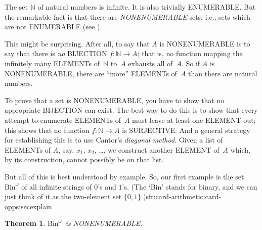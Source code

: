 \documentclass[10pt,a4paper]{article}
\makeatletter
\newcommand*{\olup}[1]{\MakeUppercase{#1}}
\theoremstyle{plain}
\newtheorem{thm}{Theorem}[section]
\theoremstyle{definition}
\theoremstyle{remark}
\newenvironment{explain}{}{}
\newcommand*{\ollabel}[1]{\label{#1}}
\newcommand{\olref}{\@ifnextchar[{\olref@i}{\olref@final}}
\def\olref@i[#1]{\@ifnextchar[{\olref@ii}{\olref@final}}
\def\olref@ii[#1]{\@ifnextchar[{\olref@iii}{\olref@final}}
\def\olref@iii[#1]{\olref@final}
\def\olref@final#1{\ref{#1}}
\providecommand{\Nat}{\ensuremath{\mathbb{N}}}
\providecommand{\funfromto}[3]{#1\colon #2 \to #3}
\providecommand{\Bin}{\mathrm{Bin}}
\providecommand{\oliflabeldef}[3]{#1}
\makeatother
\begin{document}
\begin{explain}
The set $\Nat$ of natural numbers is infinite. It is also trivially
\olup{enumerable}. But the remarkable fact is that there are
\emph{\olup{nonenumerable}} sets, i.e., sets which are not \olup{enumerable}
(see \olref[sfr][siz][enm-alt]{defn:enumerable}).

This might be surprising. After all, to say that $A$ is
\olup{nonenumerable} is to say that there is \emph{no} \olup{bijection} $f
\colon \Nat \to A$; that is, no function mapping the infinitely many
\olup{element}s of~$\Nat$ to~$A$ exhausts all of~$A$.  So if $A$ is
\olup{nonenumerable}, there are ``more'' \olup{element}s of~$A$ than there
are natural numbers.

To prove that a set is \olup{nonenumerable}, you have to show that no
appropriate \olup{bijection} can exist. The best way to do this is to
show that every attempt to enumerate \olup{element}s of~$A$ must leave at
least one \olup{element} out; this shows that no function $f\colon \Nat
\to A$ is \olup{surjective}. And a general strategy for establishing this
is to use Cantor's \emph{diagonal method}. Given a list of
\olup{element}s of $A$, say, $x_1$, $x_2$, \dots, we construct another
\olup{element} of~$A$ which, by its construction, cannot possibly be on
that list.

But all of this is best understood by example. So, our first example
is the set~$\Bin^\omega$ of all infinite strings of $0$'s and $1$'s.
(The `$\Bin$' stands for binary, and we can just think of it as the
two-element set
$\{0,1\}$.)\oliflabeldef{sfr:card-arithmetic:card-opps:sec}{\footnote{More
accurately, we should stipulate that $\Bin^\omega$ is the set of all
$\omega$-sequences of $0$'s and $1$s, i.e., the set
$\funfromto{\omega}{\{0,1\}}$. But the meaning of this will only
become clear in \olref[sfr][card-arithmetic][card-opps]{sec}.}{} This
slightly loose formulation should not cause any confusions
for now, however.}
\end{explain}

\begin{thm}
\ollabel{thm:nonenum-bin-omega}
$\Bin^\omega$~is \olup{nonenumerable}.
\end{thm}
\end{document}
